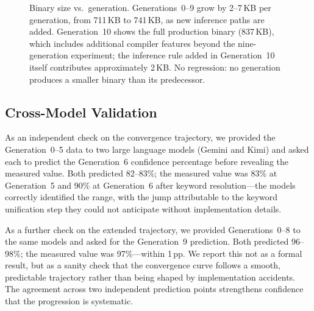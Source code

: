 \documentclass[acmsmall,screen,review,anonymous]{acmart}
\begin{document}
\begin{figure}[t]
\centering
{}
\caption{%
  Binary size vs.\ generation.
  Generations~0--9 grow by 2--7\,KB per generation, from 711\,KB to 741\,KB,
  as new inference paths are added.
  Generation~10 shows the full production binary (837\,KB), which includes
  additional compiler features beyond the nine-generation experiment;
  the inference rule added in Generation~10 itself contributes approximately
  2\,KB.
  No regression: no generation produces a smaller binary than its
  predecessor.
}
\label{fig:size}
\end{figure}

\subsection{Cross-Model Validation}

As an independent check on the convergence trajectory, we provided the
Generation~0--5 data to two large language models (Gemini and Kimi)
and asked each to predict the Generation~6 confidence percentage before
revealing the measured value.
Both predicted 82--83\%; the measured value was 83\% at Generation~5
and 90\% at Generation~6 after keyword resolution---the models correctly
identified the range, with the jump attributable to the keyword unification
step they could not anticipate without implementation details.

As a further check on the extended trajectory, we provided
Generations~0--8 to the same models and asked for the Generation~9
prediction.
Both predicted 96--98\%; the measured value was 97\%---within 1\,pp.
We report this not as a formal result, but as a sanity check that the
convergence curve follows a smooth, predictable trajectory rather than
being shaped by implementation accidents.
The agreement across two independent prediction points strengthens
confidence that the progression is systematic.
\end{document}
